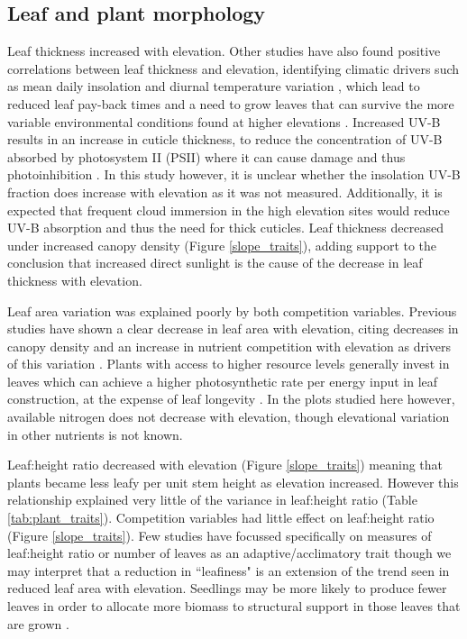 \documentclass[a4paper, 11pt]{article}
\begin{document}
\subsection*{Leaf and plant morphology}
Leaf thickness increased with elevation. Other studies have also found positive correlations between leaf thickness and elevation, identifying climatic drivers such as mean daily insolation and diurnal temperature variation \citep{Niinemets2001}, which lead to reduced leaf pay-back times and a need to grow leaves that can survive the more variable environmental conditions found at higher elevations \citep{Milla2011}. Increased UV-B results in an increase in cuticle thickness, to reduce the concentration of UV-B absorbed by photosystem II  (PSII) where it can cause damage and thus photoinhibition \citep{Vass1997, Szilard2007}. In this study however, it is unclear whether the insolation UV-B fraction does increase with elevation as it was not measured. Additionally, it is expected that frequent cloud immersion in the high elevation sites would reduce UV-B absorption and thus the need for thick cuticles. Leaf thickness decreased under increased canopy density (Figure \ref{slope_traits}), adding support to the conclusion that increased direct sunlight is the cause of the decrease in leaf thickness with elevation.

Leaf area variation was explained poorly by both competition variables. Previous studies have shown a clear decrease in leaf area with elevation, citing decreases in canopy density and an increase in nutrient competition with elevation as drivers of this variation \citep{Pan2013}. Plants with access to higher resource levels generally invest in leaves which can achieve a higher photosynthetic rate per energy input in leaf construction, at the expense of leaf longevity \citep{Mediavilla2009}. In the plots studied here however, available nitrogen does not decrease with elevation, though elevational variation in other nutrients is not known.

Leaf:height ratio decreased with elevation (Figure \ref{slope_traits}) meaning that plants became less leafy per unit stem height as elevation increased.  However this relationship explained very little of the variance in leaf:height ratio (Table \ref{tab:plant_traits}). Competition variables had little effect on leaf:height ratio (Figure \ref{slope_traits}). Few studies have focussed specifically on measures of leaf:height ratio or number of leaves as an adaptive/acclimatory trait though we may interpret that a reduction in ``leafiness" is an extension of the trend seen in reduced leaf area with elevation. Seedlings may be more likely to produce fewer leaves in order to allocate more biomass to structural support in those leaves that are grown \citep{Onoda2011}.
\end{document}
